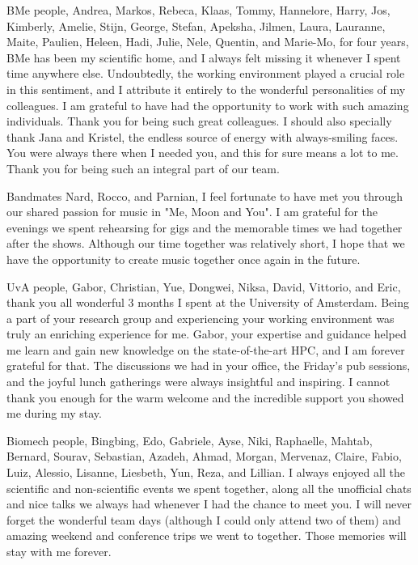 BMe people, Andrea, Markos, Rebeca, Klaas, Tommy, Hannelore, Harry, Jos, Kimberly, Amelie, Stijn, George, Stefan, Apeksha,  Jilmen, Laura, Lauranne, Maite, Paulien, Heleen, Hadi, Julie, Nele, Quentin, and Marie-Mo, for four years, BMe has been my scientific home, and I always felt missing it whenever I spent time anywhere else. Undoubtedly, the working environment played a crucial role in this sentiment, and I attribute it entirely to the wonderful personalities of my colleagues. I am grateful to have had the opportunity to work with such amazing individuals. Thank you for being such great colleagues. I should also specially thank Jana and Kristel, the endless source of energy with always-smiling faces. You were always there when I needed you, and this for sure means a lot to me. Thank you for being such an integral part of our team.

Bandmates Nard, Rocco, and Parnian, I feel fortunate to have met you through our shared passion for music in "Me, Moon and You". I am grateful for the evenings we spent rehearsing for gigs and the memorable times we had together after the shows. Although our time together was relatively short, I hope that we have the opportunity to create music together once again in the future.

UvA people, Gabor, Christian, Yue, Dongwei, Niksa, David, Vittorio, and Eric, thank you all wonderful 3 months I spent at the University of Amsterdam. Being a part of your research group and experiencing your working environment was truly an enriching experience for me. Gabor, your expertise and guidance helped me learn and gain new knowledge on the state-of-the-art HPC, and I am forever grateful for that. The discussions we had in your office, the Friday's pub sessions, and the joyful lunch gatherings were always insightful and inspiring. I cannot thank you enough for the warm welcome and the incredible support you showed me during my stay.

Biomech people, Bingbing, Edo, Gabriele, Ayse, Niki, Raphaelle, Mahtab, Bernard, Sourav, Sebastian, Azadeh, Ahmad, Morgan, Mervenaz, Claire, Fabio, Luiz, Alessio, Lisanne, Liesbeth, Yun, Reza, and Lillian. I always enjoyed all the scientific and non-scientific events we spent together, along all the unofficial chats and nice talks we always had whenever I had the chance to meet you. I will never forget the wonderful team days (although I could only attend two of them) and amazing weekend and conference trips we went to together. Those memories will stay with me forever.

